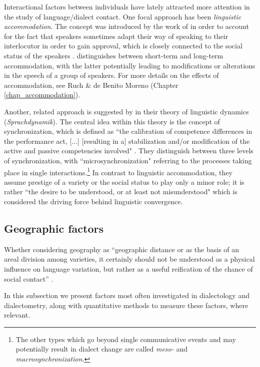 \documentclass[output=paper]{langscibook}
\begin{document}
Interactional factors between individuals have lately attracted more attention in the study of language/dialect contact. One focal approach  has been \textit{linguistic accommodation}. 
The concept was introduced by the work of \textcite[e.g.,][]{Giles1973b, Gilesetal1991, Giles2008} in order to account for the fact that speakers sometimes adapt their way of speaking to their interlocutor in order to gain approval, which is closely connected to the social status of the speakers \parencite[335]{niedzielskietal1996linguistic}.
\citet{Trudgill1986} distinguishes between short-term and long-term accommodation, with the latter potentially leading to modifications or alterations in the speech of a group of speakers.  
For more details on the effects of accommodation, see Ruch \& de Benito Moreno (Chapter \ref{chap_accommodation}). 

Another, related approach is suggested by \citet{SchmidtHerrgen2011} in their theory of linguistic dynamics (\textit{Sprachdynamik}). The central idea within this theory is the concept of synchronization, which is defined as “the calibration of competence differences in the performance act, [...] [resulting in a] stabilization and/or modification of the active and passive competencies involved" \parencite[212]{Schmidt2010}. They distinguish between three levels of synchronization, with “microsynchronization" referring to the processes taking place in single interactions.\footnote{The other types which go beyond single communicative events and may potentially result in dialect change are called \textit{meso-} and \textit{macrosynchronization}.} In contrast to linguistic accommodation, they assume prestige of a variety or the social status to play only a minor role; it is rather “the desire to be understood, or at least not misunderstood" \parencite[212]{Schmidt2010} which is considered the driving force behind linguistic convergence. 

\subsection{Geographic factors}
\label{subsection:geogfactors}
Whether considering geography as “geographic distance or as the basis of an areal division among varieties, it certainly should not be understood as a physical influence on language variation, but rather as a useful reification of the chance of social contact” \parencite[][14]{Nerbonne2013a}.

In this subsection we present factors most often investigated in dialectology and dialectometry, along with quantitative methods to measure these factors, where relevant.
\end{document}
